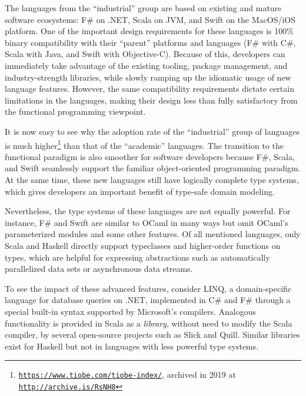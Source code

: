 The languages from the \textsf{``}industrial\textsf{''} group are based on existing
and mature software ecosystems: F\# on .NET, Scala on JVM, and Swift
on the MacOS/iOS platform. One of the important design requirements
for these languages is 100\% binary compatibility with their \textsf{``}parent\textsf{''}
platforms and languages (F\# with C\#, Scala with Java, and Swift
with Objective-C). Because of this, developers can immediately take
advantage of the existing tooling, package management, and industry-strength
libraries, while slowly ramping up the idiomatic usage of new language
features. However, the same compatibility requirements dictate certain
limitations in the languages, making their design less than fully
satisfactory from the functional programming viewpoint.

It is now easy to see why the adoption rate of the \textsf{``}industrial\textsf{''}
group of languages is much higher\footnote{\texttt{\href{https://www.tiobe.com/tiobe-index/}{https://www.tiobe.com/tiobe-index/}},
archived in 2019 at \texttt{\href{http://archive.is/RsNH8}{http://archive.is/RsNH8}}} than that of the \textsf{``}academic\textsf{''} languages. The transition to the
functional paradigm is also smoother for software developers because
F\#, Scala, and Swift seamlessly support the familiar object-oriented
programming paradigm. At the same
time, these new languages still have logically complete type systems,
which gives developers an important benefit of type-safe domain modeling.

Nevertheless, the type systems of these languages are not equally
powerful. For instance, F\# and Swift are similar to OCaml in many
ways but omit OCaml\textsf{'}s parameterized modules and some other features.
Of all mentioned languages, only Scala and Haskell directly support
typeclasses and higher-order functions on types, which are helpful
for expressing abstractions such as automatically parallelized data
sets or asynchronous data streams.

To see the impact of these advanced features, consider LINQ, a domain-specific
language for database queries on .NET, implemented in C\# and F\#
through a special built-in syntax supported by Microsoft\textsf{'}s compilers.
Analogous functionality is provided in Scala as a \emph{library},
without need to modify the Scala compiler, by several open-source
projects such as Slick and Quill. Similar libraries exist for Haskell
\textemdash{} but not in languages with less powerful type systems.

